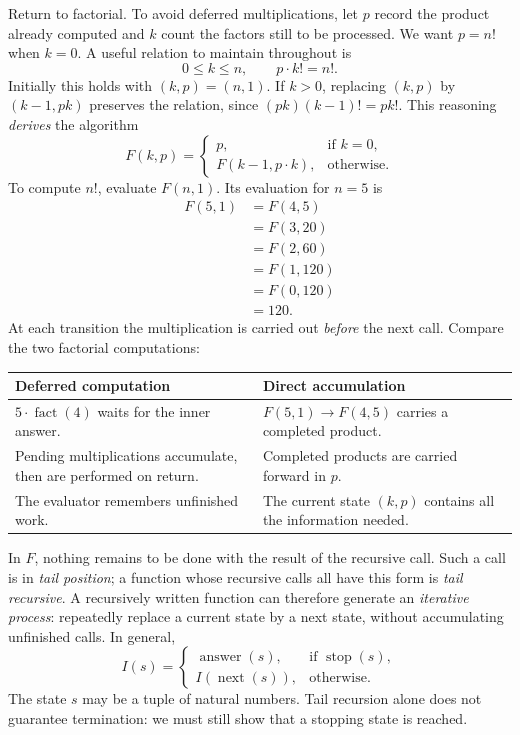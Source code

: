 Return to factorial. To avoid deferred multiplications, let $p$ record the
product already computed and $k$ count the factors still to be processed.
We want $p=n!$ when $k=0$. A useful relation to maintain throughout is
\[
0\leq k\leq n,\qquad p\cdot k!=n!.
\]
Initially this holds with $(k,p)=(n,1)$. If $k>0$, replacing $(k,p)$ by
$(k-1,pk)$ preserves the relation, since $(pk)(k-1)!=pk!$.
This reasoning \emph{derives} the algorithm
\[
F(k,p)=\begin{cases}
p,&\text{if }k=0,\\
F(k-1,p\cdot k),&\text{otherwise}.
\end{cases}
\]
To compute $n!$, evaluate $F(n,1)$. Its evaluation for $n=5$ is
\[
\begin{aligned}
F(5,1)&=F(4,5)\\
      &=F(3,20)\\
      &=F(2,60)\\
      &=F(1,120)\\
      &=F(0,120)\\
      &=120.
\end{aligned}
\]
At each transition the multiplication is carried out \emph{before} the next
call. Compare the two factorial computations:
\begin{center}
\begin{tabular}{p{} p{}}
\hline
\textbf{Deferred computation} & \textbf{Direct accumulation}\\
\hline
$5\cdot\operatorname{fact}(4)$ waits for the inner answer.
& $F(5,1)\longrightarrow F(4,5)$ carries a completed product.\\
Pending multiplications accumulate, then are performed on return.
& Completed products are carried forward in $p$.\\
The evaluator remembers unfinished work.
& The current state $(k,p)$ contains all the information needed.\\
\hline
\end{tabular}
\end{center}

In $F$, nothing remains to be done with the result of the recursive call.
Such a call is in \emph{tail position}; a function whose recursive calls
all have this form is \emph{tail recursive}. A recursively written function
can therefore generate an \emph{iterative process}: repeatedly replace a
current state by a next state, without accumulating unfinished calls.
In general,
\[
I(s)=\begin{cases}
\operatorname{answer}(s),&\text{if }\operatorname{stop}(s),\\
I(\operatorname{next}(s)),&\text{otherwise}.
\end{cases}
\]
The state $s$ may be a tuple of natural numbers. Tail recursion alone does
not guarantee termination: we must still show that a stopping state is reached.

